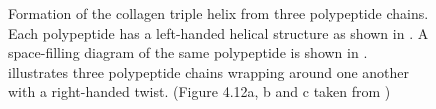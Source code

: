 \begin{figure}
\centering
{}
\hspace{20 mm}                
\hspace{20 mm}
\caption{Formation of the collagen triple helix from three polypeptide chains. Each polypeptide has a left-handed helical structure as shown in . A space-filling diagram of the same polypeptide is shown in .  illustrates three polypeptide chains wrapping around one another with a right-handed twist. (Figure 4.12a, b and c taken from \cite{Nelson2004})}  
\label{fig:polypeptide_to_tropocollagen}
\end{figure}

